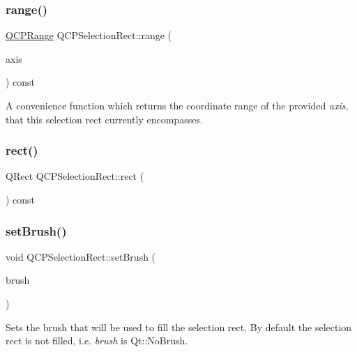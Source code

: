 \subsubsection{\texorpdfstring{range()}{range()}}
{\footnotesize\ttfamily \hyperlink{class_q_c_p_range}{Q\+C\+P\+Range} Q\+C\+P\+Selection\+Rect\+::range (\begin{DoxyParamCaption}\item[{const \hyperlink{class_q_c_p_axis}{Q\+C\+P\+Axis} $\ast$}]{axis }\end{DoxyParamCaption}) const}

A convenience function which returns the coordinate range of the provided {\itshape axis}, that this selection rect currently encompasses. \mbox{\label{class_q_c_p_selection_rect_a3812115ae4dfe2855bf1e58331c14805}} 
\subsubsection{\texorpdfstring{rect()}{rect()}}
{\footnotesize\ttfamily Q\+Rect Q\+C\+P\+Selection\+Rect\+::rect (\begin{DoxyParamCaption}{ }\end{DoxyParamCaption}) const\hspace{0.3cm}{\ttfamily [inline]}}

\mbox{\label{class_q_c_p_selection_rect_ab0c66f1484418782efa01f4153611080}} 
\subsubsection{\texorpdfstring{set\+Brush()}{setBrush()}}
{\footnotesize\ttfamily void Q\+C\+P\+Selection\+Rect\+::set\+Brush (\begin{DoxyParamCaption}\item[{const Q\+Brush \&}]{brush }\end{DoxyParamCaption})}

Sets the brush that will be used to fill the selection rect. By default the selection rect is not filled, i.\+e. {\itshape brush} is {\ttfamily Qt\+::\+No\+Brush}.

